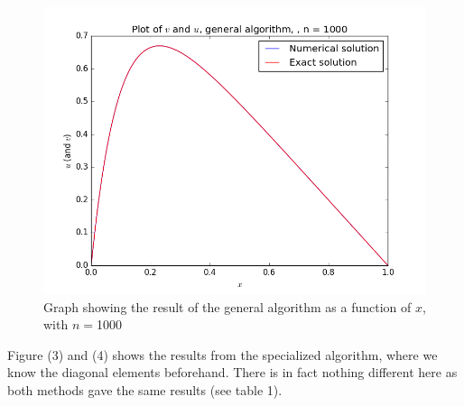 \documentclass[12pt]{article}
\begin{document}
\begin{figure}[hbtp]
\centering
\includegraphics[scale=0.5]{Data_plots/General_data_n1000.png}
\caption{Graph showing the result of the general algorithm  as a function of $x$, with $n=$1000}
\end{figure}

Figure (3) and (4) shows the results from the specialized algorithm, where we know the diagonal elements beforehand. There is in fact nothing different here as both methods gave the same results (see table 1). 
\end{document}
